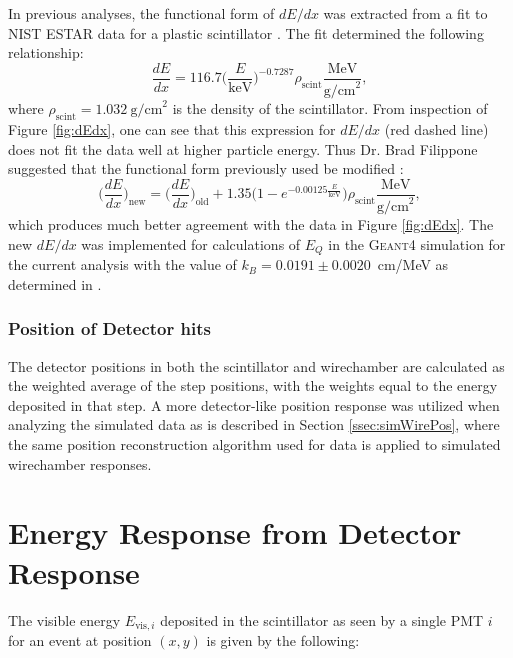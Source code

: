 In previous analyses, the functional form of $dE/dx $ was extracted from a fit to NIST ESTAR data
for a plastic scintillator \cite{yuan2006progress}. The fit determined the following relationship:
%
\begin{equation}
  \frac{dE}{dx} = 116.7\bigg(\frac{E}{\mathrm{keV}}\bigg)^{-0.7287} \rho_{\mathrm{scint}} \frac{\mathrm{MeV}}{\mathrm{g/cm}^2},
\end{equation}
%
where $\rho_{\mathrm{scint}}=1.032~\mathrm{g/cm}^2$ is the density of the scintillator. From
inspection of Figure \ref{fig:dEdx}, one can see that this expression for $dE/dx$ (red dashed line)
does not fit the data well at higher particle energy. Thus Dr. Brad Filippone suggested that the
functional form previously used be modified \cite{bradF_ELOG}:
%
\begin{equation}
  \bigg(\frac{dE}{dx}\bigg)_{\mathrm{new}} = \bigg(\frac{dE}{dx}\bigg)_{\mathrm{old}} + 1.35\big(1-e^{-0.00125\frac{E}{\mathrm{keV}}}\big) \rho_{\mathrm{scint}} \frac{\mathrm{MeV}}{\mathrm{g/cm}^2},
\end{equation}
%
which produces much better agreement with the data in Figure \ref{fig:dEdx}. The new $dE/dx$ was implemented for calculations
of $E_Q$ in the \textsc{Geant4} simulation for the current analysis with the value of $k_B=0.0191\pm0.0020$~cm/MeV as determined in
\cite{yuan2006progress}.




\subsubsection{Position of Detector hits}
The detector positions in both the scintillator and wirechamber are calculated as the weighted
average of the step positions, with the weights equal to the energy deposited in that step.
A more detector-like position response was utilized when analyzing the simulated data as is described
in Section \ref{ssec:simWirePos}, where the same position reconstruction algorithm used for data
is applied to simulated wirechamber responses.



\section{Energy Response from Detector Response} \label{sec:EnergyResponse}

The visible energy $E_{\mathrm{vis},i}$ deposited
in the scintillator as seen by a single PMT $i$ for an event at position $(x,y)$ 
is given by the following: 

